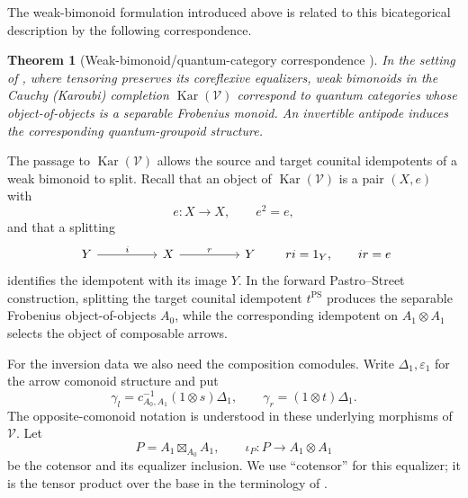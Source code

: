 \documentclass[oneside]{article}
\newcommand{\Kar}{\operatorname{Kar}}
\theoremstyle{plain}
\newtheorem{theorem}{Theorem}[section]
\theoremstyle{definition}
\theoremstyle{remark}
\begin{document}
The weak-bimonoid formulation introduced above is related to this bicategorical description by the following correspondence.

\begin{theorem}[Weak-bimonoid/quantum-category correspondence
{\cite[Thm.~6.1]{PastroStreet2009}}]
\label{thm:cgqg-background-pastro-street}
In the setting of \cite[\S5]{PastroStreet2009}, where tensoring preserves
its coreflexive equalizers, weak bimonoids in the Cauchy (Karoubi)
completion \(\Kar(\mathcal V)\) correspond to quantum categories whose
object-of-objects is a separable Frobenius monoid. An invertible antipode
induces the corresponding quantum-groupoid structure.
\end{theorem}

The passage to \(\Kar(\mathcal V)\) allows the source and target counital idempotents of a weak bimonoid to split. Recall that an object of \(\Kar(\mathcal V)\) is a pair \((X,e)\) with
\[
    e:X\longrightarrow X,
    \qquad
    e^2=e,
\]
and that a splitting
\begin{equation*}
    \begin{tikzcd}[column sep=huge]
        Y
            \arrow[r,"i"]
        &
        X
            \arrow[r,"r"]
        &
        Y
    \end{tikzcd}
    \qquad
    ri=1_Y,
    \qquad
    ir=e
\end{equation*}
identifies the idempotent with its image \(Y\). In the forward Pastro--Street construction, splitting the target counital idempotent \(t^{\mathrm{PS}}\) produces the separable Frobenius object-of-objects \(A_0\), while the corresponding idempotent on \(A_1\otimes A_1\) selects the object of composable arrows.

For the inversion data we also need the composition comodules. Write
\(\Delta_1,\varepsilon_1\) for the arrow comonoid structure and put
\[
 \gamma_l=c^{-1}_{A_0,A_1}(1\otimes s)\Delta_1,
 \qquad \gamma_r=(1\otimes t)\Delta_1.
\]
The opposite-comonoid notation is understood in these underlying
morphisms of \(\mathcal V\). Let
\[
 P=A_1\boxtimes_{A_0}A_1,
 \qquad \iota_P:P\longrightarrow A_1\otimes A_1
\]
be the cotensor and its equalizer inclusion. We use ``cotensor'' for this
equalizer; it is the tensor product over the base in the terminology of
\cite{PastroStreet2009}.
\end{document}
